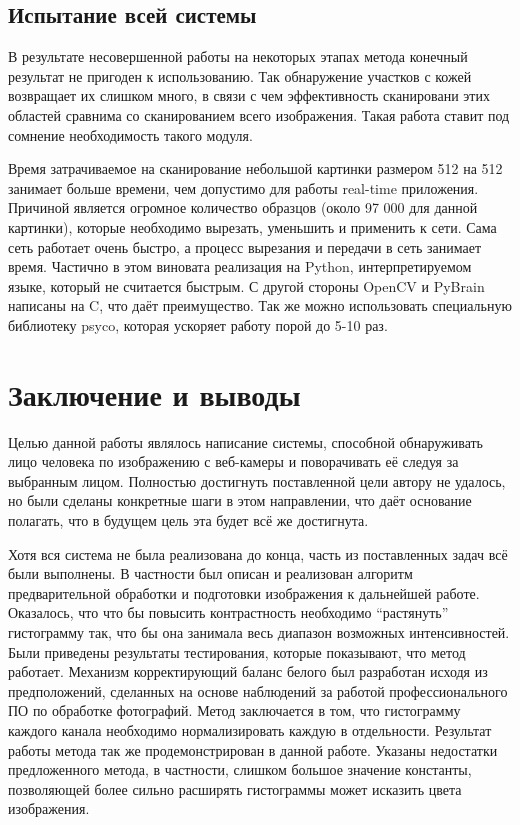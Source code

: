 \documentclass[12pt]{report}
\begin{document}
\section{Испытание всей системы}

В результате несовершенной работы на некоторых этапах метода конечный результат не пригоден к использованию. Так 
обнаружение участков с кожей возвращает их слишком много, в связи с чем эффективность сканировани этих областей 
сравнима со сканированием всего изображения. Такая работа ставит под сомнение необходимость такого модуля.

Время затрачиваемое на сканирование небольшой картинки размером 512 на 512 занимает больше времени, чем допустимо для  
работы real-time приложения. Причиной является огромное количество образцов (около 97 000 для данной картинки), 
которые необходимо вырезать, уменьшить и применить к сети. Сама сеть работает очень быстро, а процесс вырезания и 
передачи в сеть занимает время. Частично в этом виновата реализация на Python, интерпретируемом языке, который не 
считается быстрым. С другой стороны OpenCV и PyBrain написаны на C, что даёт преимущество. Так же можно использовать 
специальную библиотеку psyco, которая ускоряет работу порой до 5-10 раз.

\chapter*{Заключение и выводы}
\thispagestyle{fancy}

Целью данной работы являлось написание системы, способной обнаруживать лицо человека по изображению с веб-камеры и  поворачивать её следуя за выбранным лицом. Полностью достигнуть поставленной цели автору не удалось, но были сделаны конкретные шаги в этом направлении, что даёт основание полагать, что в будущем цель эта будет всё же достигнута.

Хотя вся система не была реализована до конца, часть из поставленных задач всё были выполнены. В частности был описан и реализован алгоритм предварительной обработки и подготовки изображения к дальнейшей работе. Оказалось, что что бы повысить контрастность необходимо ``растянуть'' гистограмму так, что бы она занимала весь диапазон возможных интенсивностей. Были приведены результаты тестирования, которые показывают, что метод работает. Механизм корректирующий баланс белого был разработан исходя из предположений, сделанных на основе наблюдений за работой профессионального ПО по обработке фотографий. Метод заключается в том, что гистограмму каждого канала необходимо нормализировать каждую в отдельности. Результат работы метода так же продемонстрирован в данной работе. Указаны недостатки предложенного метода, в частности, слишком большое значение константы, позволяющей более сильно расширять гистограммы может исказить цвета изображения. 
\end{document}
